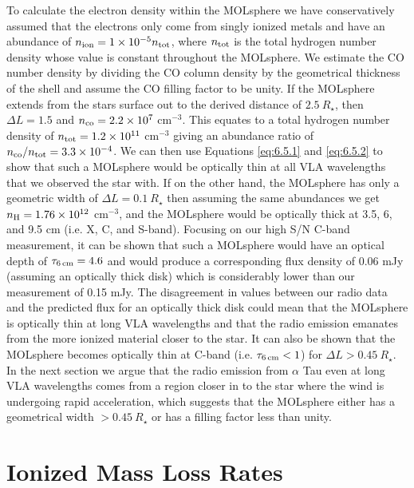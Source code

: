 To calculate the electron density within the MOLsphere we have conservatively assumed that the electrons only come from singly ionized metals and have an abundance of $n_{\rm{ion}}=1\times 10^{-5} n_{\rm{tot}}$, where $n_{\rm{tot}}$ is the total hydrogen number density whose value is constant throughout the MOLsphere. We estimate the CO number density by dividing the CO column density by the geometrical thickness of the shell and assume the CO filling factor to be unity. If the MOLsphere extends from the stars surface out to the derived distance of $2.5 \ R_{\star}$, then $\Delta L = 1.5$ and $n_{\rm{co}} = 2.2 \times 10^{7} $ cm$^{-3}$. This equates to a total hydrogen number density of $n_{\rm{tot}}=1.2 \times 10^{11}$ cm$^{-3}$ \citep{ohnaka_2013} giving an abundance ratio of $n_{\rm{co}}/n_{\rm{tot}} = 3.3\times 10^{-4}$. We can then use Equations \ref{eq:6.5.1} and \ref{eq:6.5.2} to show that such a MOLsphere would be optically thin at all VLA wavelengths that we observed the star with. If on the other hand, the MOLsphere has only a geometric width of $\Delta L = 0.1 \ R_{\star}$ then assuming the same abundances we get $n_{\rm{H}}=1.76\times 10^{12}$ cm$^{-3}$, and the MOLsphere would be optically thick at 3.5, 6, and 9.5 cm (i.e. X, C, and S-band). Focusing on our high S/N C-band measurement, it can be shown that such a MOLsphere would have an optical depth of $\tau _{\rm{6\,cm}} = 4.6$ and would produce a corresponding flux density of  0.06 mJy (assuming an optically thick disk) which is considerably lower than our measurement of 0.15 mJy. The disagreement in values between our radio data and the predicted flux for an optically thick disk could mean that the MOLsphere is optically thin at long VLA wavelengths and that the radio emission emanates from the more ionized material closer to the star. It can also be shown that the MOLsphere becomes optically thin at C-band (i.e. $\tau _{\rm{6\,cm}} < 1$) for $\Delta L > 0.45 \ R_{\star}$. In the next section we argue that the radio emission from $\alpha$ Tau even at long VLA wavelengths comes from a region closer in to the star where the wind is undergoing rapid acceleration, which suggests that the MOLsphere either has a geometrical width  $> 0.45 \ R _{\star}$ or has a filling factor less than unity.

\section{Ionized Mass Loss Rates}\label{sec:6.5b}

